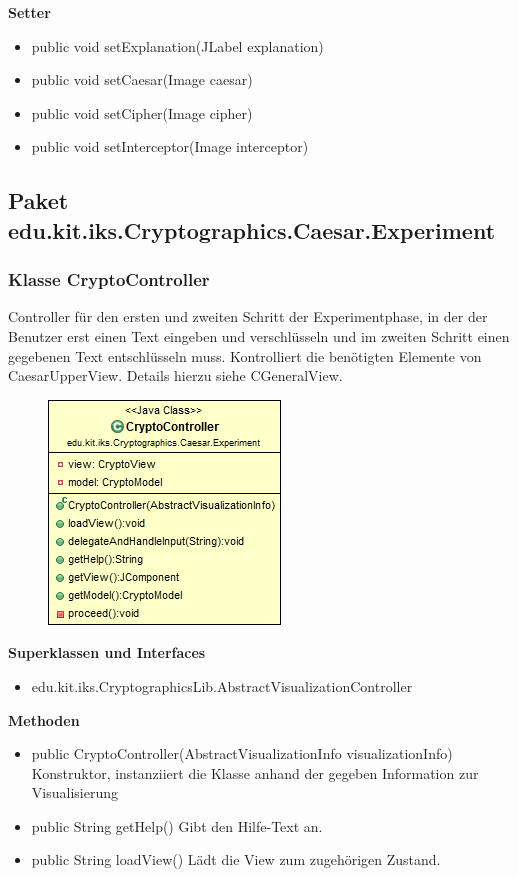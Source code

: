 \documentclass{article}
\begin{document}
      \textbf{Setter}
      \begin{itemize}
        \item public void setExplanation(JLabel explanation)
        \item public void setCaesar(Image caesar)
        \item public void setCipher(Image cipher)
        \item public void setInterceptor(Image interceptor)
      \end{itemize}

\subsection{Paket edu.kit.iks.Cryptographics.Caesar.Experiment}

\subsubsection{Klasse CryptoController}
      Controller für den ersten und zweiten Schritt der Experimentphase, in der der Benutzer erst einen Text eingeben und verschlüsseln und im zweiten Schritt einen gegebenen Text entschlüsseln muss.
      Kontrolliert die benötigten Elemente von CaesarUpperView. Details hierzu siehe CGeneralView.

      \begin{figure}[H]
        \centering
        \includegraphics{resources/edu-kit-iks-Cryptographics-Caesar-Experiment-CryptoController}
      \end{figure}

      \textbf{Superklassen und Interfaces}
      \begin{itemize}
        \item edu.kit.iks.CryptographicsLib.AbstractVisualizationController
      \end{itemize}

      \textbf{Methoden}
      \begin{itemize}
        \item public CryptoController(AbstractVisualizationInfo visualizationInfo) \newline
        Konstruktor, instanziiert die Klasse anhand der gegeben Information zur Visualisierung
        \item public String getHelp() \newline
        Gibt den Hilfe-Text an.
        \item public String loadView() \newline
        Lädt die View zum zugehörigen Zustand.
      \end{itemize}
\end{document}

